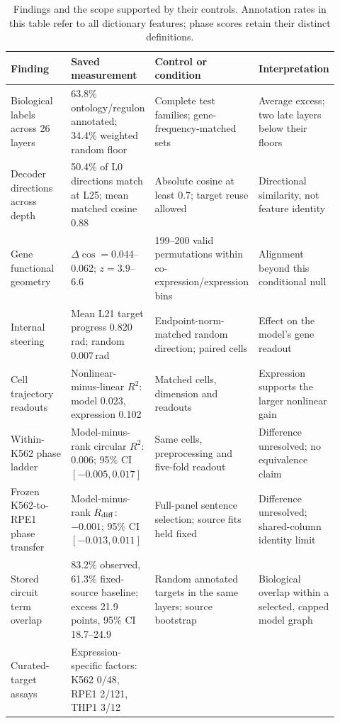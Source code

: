 \documentclass[review,authoryear,12pt]{elsarticle}
\begin{document}
\begin{table}[htbp]
\centering
\caption{Findings and the scope supported by their controls. Annotation rates in this table
refer to all dictionary features; phase scores retain their distinct definitions.}
\label{tab:findings}
\footnotesize\linespread{1}\selectfont
\setlength{\tabcolsep}{3pt}
\begin{tabular}{@{}L{0.22\linewidth}L{0.25\linewidth}L{0.24\linewidth}L{0.21\linewidth}@{}}
\toprule
\textbf{Finding} & \textbf{Saved measurement} & \textbf{Control or condition} & \textbf{Interpretation} \\
\midrule
Biological labels across 26 layers & 63.8\% ontology/regulon annotated; 34.4\% weighted random floor &
Complete test families; gene-frequency-matched sets & Average excess; two late layers below their floors \\
Decoder directions across depth & 50.4\% of L0 directions match at L25; mean matched cosine 0.88 &
Absolute cosine at least 0.7; target reuse allowed & Directional similarity, not feature identity \\
Gene functional geometry & $\Delta\cos=0.044$--0.062; $z=3.9$--6.6 &
199--200 valid permutations within co-expression/expression bins & Alignment beyond this conditional null \\
Internal steering & Mean L21 target progress 0.820\,rad; random 0.007\,rad &
Endpoint-norm-matched random direction; paired cells & Effect on the model's gene readout \\
Cell trajectory readouts & Nonlinear-minus-linear $R^2$: model 0.023, expression 0.102 &
Matched cells, dimension and readouts & Expression supports the larger nonlinear gain \\
Within-K562 phase ladder & Model-minus-rank circular $R^2$: 0.006; 95\% CI $[-0.005,0.017]$ &
Same cells, preprocessing and five-fold readout & Difference unresolved; no equivalence claim \\
Frozen K562-to-RPE1 phase transfer & Model-minus-rank $R_{\rm diff}$: $-0.001$;
95\% CI $[-0.013,0.011]$ & Full-panel sentence selection; source fits held fixed &
Difference unresolved; shared-column identity limit \\
Stored circuit term overlap & 83.2\% observed, 61.3\% fixed-source baseline;
excess 21.9 points, 95\% CI 18.7--24.9 & Random annotated targets in the same layers;
source bootstrap & Biological overlap within a selected, capped model graph \\
Curated-target assays & Expression-specific factors: K562 0/48, RPE1 2/121, THP1 3/12 &

\end{tabular}
\end{table}
\end{document}
